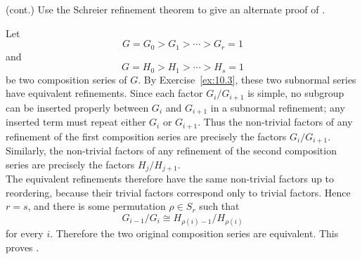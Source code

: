 \documentclass[../Odyssey_Project.tex]{subfiles}
\begin{document}
\begin{exercise}
\label{ex:10.4}
(cont.) Use the Schreier refinement theorem to give an alternate proof of .
\end{exercise}
\begin{solution}
Let
\[
  G=G_0>G_1>\cdots>G_r=1
\]
and
\[
  G=H_0>H_1>\cdots>H_s=1
\]
be two composition series of $G$. By Exercise~\ref{ex:10.3}, these two subnormal series have equivalent refinements. Since each factor $G_i/G_{i+1}$ is simple, no subgroup can be inserted properly between $G_i$ and $G_{i+1}$ in a subnormal refinement; any inserted term must repeat either $G_i$ or $G_{i+1}$. Thus the non-trivial factors of any refinement of the first composition series are precisely the factors $G_i/G_{i+1}$. Similarly, the non-trivial factors of any refinement of the second composition series are precisely the factors $H_j/H_{j+1}$.\\
The equivalent refinements therefore have the same non-trivial factors up to reordering, because their trivial factors correspond only to trivial factors. Hence $r=s$, and there is some permutation $\rho\in S_r$ such that
\[
  G_{i-1}/G_i\cong H_{\rho(i)-1}/H_{\rho(i)}
\]
for every $i$. Therefore the two original composition series are equivalent. This proves .
\end{solution}
\end{document}

